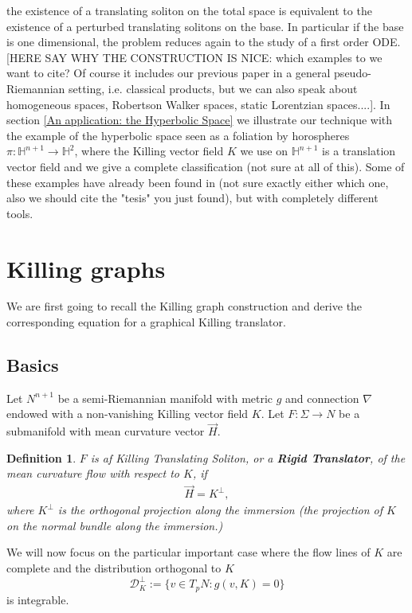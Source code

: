 \documentclass[12pt]{article}
\newcommand{\MA}[1]{\textcolor{marieamelie}{#1}}
\newtheorem{definition}[lemma]{Definition}
\numberwithin{lemma}{section}
\begin{document}
the existence of a translating soliton on the total space is equivalent to the existence of a perturbed translating solitons on the base. In particular if the base is one dimensional, the problem reduces again to the study of a first order ODE. [\MA{HERE SAY WHY THE CONSTRUCTION IS NICE: which examples to we want to cite? Of course it includes our previous paper in a general pseudo-Riemannian setting, i.e. classical products, but we can also speak about homogeneous spaces, Robertson Walker spaces, static Lorentzian spaces....}]. In section \ref{An application: the Hyperbolic Space} we illustrate our technique with the example of the hyperbolic space seen as a foliation by horospheres $\pi:\mathbb{H}^{n+1}\rightarrow\mathbb{H}^2$, where the Killing vector field $K$ we use on $\mathbb{H}^{n+1}$ is a translation vector field and we give a complete classification (\MA{not sure at all of this}). Some of these examples have already been found in \cite{LM} (\MA{not sure exactly either which one, also we should cite the "tesis" you just found}), but with completely different tools.

\section{Killing graphs}\label{Killing graph}
We are first going to recall the Killing graph construction and derive the corresponding equation for a graphical Killing translator. 
\subsection{Basics}\label{basics}
Let $N^{n+1}$ be a semi-Riemannian manifold with metric $g$ and connection $\nabla$ endowed with a non-vanishing  Killing vector field $K$. Let $F:\Sigma\rightarrow N$ be a submanifold with mean curvature vector $\vec{H}$.  
\begin{definition} $F$ is af Killing Translating Soliton, or a \textbf{Rigid Translator}, of the mean curvature flow with respect to $K$, if 
\begin{eqnarray}\label{def_TKS} \vec{H}= K^{\perp},
\end{eqnarray}
where $K^{\perp}$ is the orthogonal projection along the immersion (the projection of $K$ on the normal bundle along the immersion.)
\end{definition}
We will now focus on the particular important case where the flow lines of $K$ are complete and the distribution orthogonal to $K$
\[\mathcal{D}_K^{\perp}:=\{v\in T_pN:g(v,K)=0\}\]
is integrable.
\end{document}
